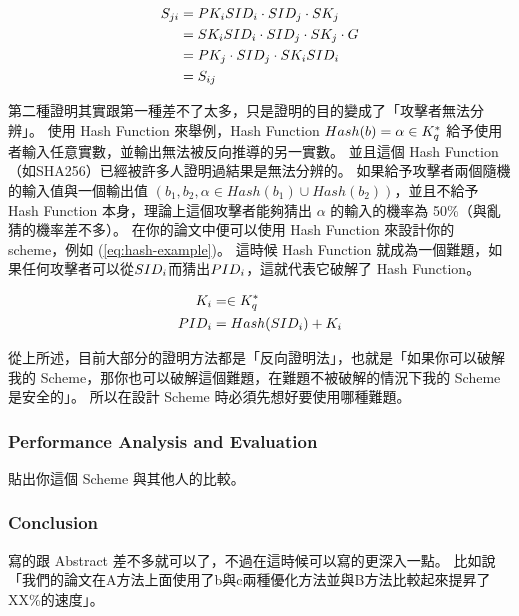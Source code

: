 \begin{align}
	S_{ji} & = PK_{i}SID_{i}\cdot{}SID_{j}\cdot{}SK_{j} \nonumber         \\
	                & = SK_{i}SID_{i}\cdot{}SID_{j}\cdot{}SK_{j}\cdot{}G \nonumber \\
	                & = PK_{j}\cdot{}SID_{j}\cdot{}SK_{i}SID_{i} \nonumber         \\
	                & = S_{ij}\label{eq:SessionKey}
\end{align}

第二種證明其實跟第一種差不了太多，只是證明的目的變成了「攻擊者無法分辨」。
使用 Hash Function 來舉例，Hash Function $Hash(b) = \alpha \in K^{*}_{q}$ 給予使用者輸入任意實數，並輸出無法被反向推導的另一實數。
並且這個 Hash Function （如SHA256）已經被許多人證明過結果是無法分辨的。
如果給予攻擊者兩個隨機的輸入值與一個輸出值 $(b_1, b_2, \alpha \in Hash(b_1) \cup Hash(b_2))$，並且不給予 Hash Function 本身，理論上這個攻擊者能夠猜出 $\alpha$ 的輸入的機率為 50\%（與亂猜的機率差不多）。
在你的論文中便可以使用 Hash Function 來設計你的 scheme，例如 (\ref{eq:hash-example})。
這時候 Hash Function 就成為一個難題，如果任何攻擊者可以從$SID_{i}$而猜出$PID_{i}$，這就代表它破解了 Hash Function。

\begin{align}
	K_i     & = \in K^{*}_{q} \nonumber                  \\
	PID_{i} & = Hash(SID_{i}) + K_i \label{eq:hash-example}
\end{align}

從上所述，目前大部分的證明方法都是「反向證明法」，也就是「如果你可以破解我的 Scheme，那你也可以破解這個難題，在難題不被破解的情況下我的 Scheme 是安全的」。
所以在設計 Scheme 時必須先想好要使用哪種難題。

\ChineseNotation{}

\subsubsection{Performance Analysis and Evaluation}

貼出你這個 Scheme 與其他人的比較。

\subsubsection{Conclusion}

寫的跟 Abstract 差不多就可以了，不過在這時候可以寫的更深入一點。
比如說「我們的論文在A方法上面使用了b與c兩種優化方法並與B方法比較起來提昇了XX\%的速度」。

